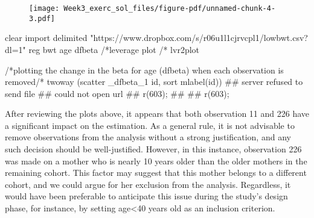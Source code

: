 \documentclass[
  letterpaper,
  DIV=11,
  numbers=noendperiod]{scrreprt}
\newenvironment{Shaded}{\begin{snugshade}}{\end{snugshade}}
\newcommand{\CommentTok}[1]{\textcolor[rgb]{0.37,0.37,0.37}{#1}}
\newcommand{\KeywordTok}[1]{\textcolor[rgb]{0.00,0.23,0.31}{#1}}
\newcommand{\NormalTok}[1]{\textcolor[rgb]{0.00,0.23,0.31}{#1}}
\newcommand{\StringTok}[1]{\textcolor[rgb]{0.13,0.47,0.30}{#1}}
\begin{document}
\begin{figure}[H]

{\centering \texttt{[image: Week3\_exerc\_sol\_files/figure-pdf/unnamed-chunk-4-3.pdf]}

}

\end{figure}

\begin{Shaded}
\begin{Highlighting}[]
\KeywordTok{clear}
\NormalTok{import delimited }\StringTok{"https://www.dropbox.com/s/r06u1l1cjrvcpl1/lowbwt.csv?dl=1"}
\KeywordTok{reg}\NormalTok{ bwt age}
\KeywordTok{dfbeta}
\CommentTok{/*leverage plot /*}
\CommentTok{lvr2plot }

\CommentTok{/*plotting the change in the beta for age  (dfbeta) }
\CommentTok{when each observation is removed/*}
\CommentTok{twoway (scatter \_dfbeta\_1 id, sort mlabel(id))}
\CommentTok{\#\# server refused to send file}
\CommentTok{\#\# could not open url}
\CommentTok{\#\# r(603);}
\CommentTok{\#\# }
\CommentTok{\#\# r(603);}
\end{Highlighting}
\end{Shaded}

After reviewing the plots above, it appears that both observation 11 and
226 have a significant impact on the estimation. As a general rule, it
is not advisable to remove observations from the analysis without a
strong justification, and any such decision should be well-justified.
However, in this instance, observation 226 was made on a mother who is
nearly 10 years older than the older mothers in the remaining cohort.
This factor may suggest that this mother belongs to a different cohort,
and we could argue for her exclusion from the analysis. Regardless, it
would have been preferable to anticipate this issue during the study's
design phase, for instance, by setting age\textless40 years old as an
inclusion criterion.
\end{document}
